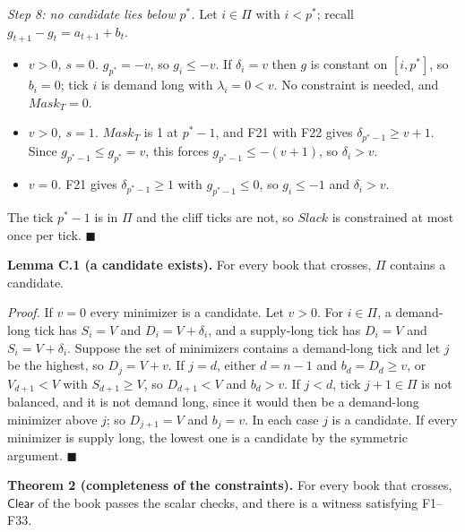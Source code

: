 \emph{Step 8: no candidate lies below \(p^*\).} Let \(i \in \Pi\) with \(i < p^*\); recall \(g_{t+1} - g_t = a_{t+1} + b_t\).

\begin{itemize}
\item
  \emph{\(v > 0\), \(s = 0\).} \(g_{p^*} = -v\), so \(g_i \le -v\). If \(\delta_i = v\) then \(g\) is constant on \([i, p^*]\), so \(b_i = 0\); tick \(i\) is demand long with \(\lambda_i = 0 < v\). No constraint is needed, and \(Mask_T = 0\).
\item
  \emph{\(v > 0\), \(s = 1\).} \(Mask_T\) is 1 at \(p^* - 1\), and F21 with F22 gives \(\delta_{p^*-1} \ge v + 1\). Since \(g_{p^*-1} \le g_{p^*} = v\), this forces \(g_{p^*-1} \le -(v+1)\), so \(\delta_i > v\).
\item
  \emph{\(v = 0\).} F21 gives \(\delta_{p^*-1} \ge 1\) with \(g_{p^*-1} \le 0\), so \(g_i \le -1\) and \(\delta_i > v\).
\end{itemize}

The tick \(p^* - 1\) is in \(\Pi\) and the cliff ticks are not, so \(Slack\) is constrained at most once per tick. \(\blacksquare\)

\textbf{Lemma C.1 (a candidate exists).} For every book that crosses, \(\Pi\) contains a candidate.

\emph{Proof.} If \(v = 0\) every minimizer is a candidate. Let \(v > 0\). For \(i \in \Pi\), a demand-long tick has \(S_i = V\) and \(D_i = V + \delta_i\), and a supply-long tick has \(D_i = V\) and \(S_i = V + \delta_i\). Suppose the set of minimizers contains a demand-long tick and let \(j\) be the highest, so \(D_j = V + v\). If \(j = d\), either \(d = n - 1\) and \(b_d = D_d \ge v\), or \(V_{d+1} < V\) with \(S_{d+1} \ge V\), so \(D_{d+1} < V\) and \(b_d > v\). If \(j < d\), tick \(j + 1 \in \Pi\) is not balanced, and it is not demand long, since it would then be a demand-long minimizer above \(j\); so \(D_{j+1} = V\) and \(b_j = v\). In each case \(j\) is a candidate. If every minimizer is supply long, the lowest one is a candidate by the symmetric argument. \(\blacksquare\)

\textbf{Theorem 2 (completeness of the constraints).} For every book that crosses, \(\mathsf{Clear}\) of the book passes the scalar checks, and there is a witness satisfying F1--F33.

